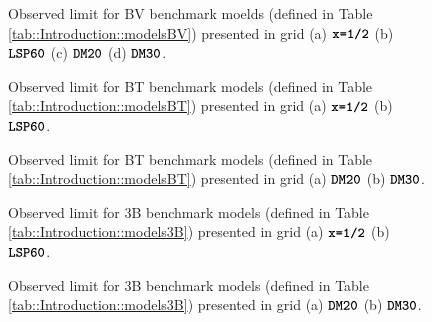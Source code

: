 \begin{figure}[h]
  \centering
    \caption{
    Observed limit for BV benchmark moelds (defined in Table \ref{tab::Introduction::modelsBV}) presented in grid (a) $\mathrm{\textbf{\texttt{x=1/2}}}$ (b) $\mathrm{\textbf{\texttt{LSP60}}}$ (c) $\mathrm{\textbf{\texttt{DM20}}}$ (d) $\mathrm{\textbf{\texttt{DM30}}}$.
      \label{fig::Result::combLimit::BV1} }
\end{figure}


\clearpage
\begin{figure}[h]
  \centering
    \caption{
    Observed limit for BT benchmark models (defined in Table \ref{tab::Introduction::modelsBT}) presented in grid (a) $\mathrm{\textbf{\texttt{x=1/2}}}$ (b) $\mathrm{\textbf{\texttt{LSP60}}}$.
      \label{fig::Result::combLimit::BT1} }
\end{figure}


\begin{figure}[h]
  \centering
    \caption{
    Observed limit for BT benchmark models (defined in Table \ref{tab::Introduction::modelsBT}) presented in grid (a) $\mathrm{\textbf{\texttt{DM20}}}$ (b) $\mathrm{\textbf{\texttt{DM30}}}$.
      \label{fig::Result::combLimit::BT2} }
\end{figure}



\clearpage
\begin{figure}[h]
  \centering
    \caption{
    Observed limit for 3B benchmark models (defined in Table \ref{tab::Introduction::models3B}) presented in grid (a) $\mathrm{\textbf{\texttt{x=1/2}}}$ (b) $\mathrm{\textbf{\texttt{LSP60}}}$.
      \label{fig::Result::combLimit::3B1} }
\end{figure}

\begin{figure}[h]
  \centering
    \caption{
    Observed limit for 3B benchmark models (defined in Table \ref{tab::Introduction::models3B}) presented in grid (a) $\mathrm{\textbf{\texttt{DM20}}}$ (b) $\mathrm{\textbf{\texttt{DM30}}}$.
      \label{fig::Result::combLimit::3B2} }
\end{figure}



